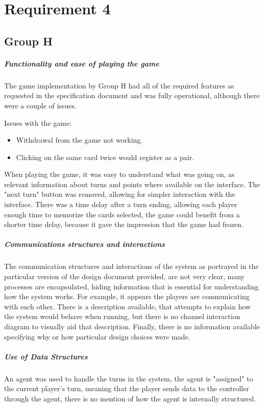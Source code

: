 \documentclass[10pt, a4paper]{article}
\begin{document}
	\section{Requirement 4}
	\subsection{Group H}
	
	\subparagraph{Functionality and ease of playing the game}
	The game implementation by Group H had all of the required features as requested in the specification document and was fully operational, although there were a couple of issues. 			

	Issues with the game:
	\begin{itemize}
	\item{Withdrawal from the game not working.}
	\item{Clicking on the same card twice would register as a pair.}
	\end{itemize}
	When playing the game, it was easy to understand what was going on, as relevant information about turns and points where available on the interface. The "next turn" button was 		removed, allowing for simpler interaction with the interface. There was a time delay after a turn ending, allowing each player enough time to memorize the cards selected, the game 	could benefit from a shorter time delay, because it gave the impression that the game had frozen.
	\subparagraph{Communications structures and interactions}
	The communication structures and interactions of the system as portrayed in the particular version of the design document provided, are not very clear, many processes are encapsulated, hiding information that is essential for understanding how the system works. For example, it appears the players are communicating with each other. There is a description available, that attempts to explain how the system would behave when running, but there is no channel interaction diagram to visually aid that description. Finally, there is no information available specifying why or how particular design choices were made.
	\subparagraph{Use of Data Structures}
	An agent was used to handle the turns in the system, the agent is "assigned" to the current player's turn, meaning that the player sends data to the controller through the agent, there is no mention of how the agent is internally structured.
\end{document}
